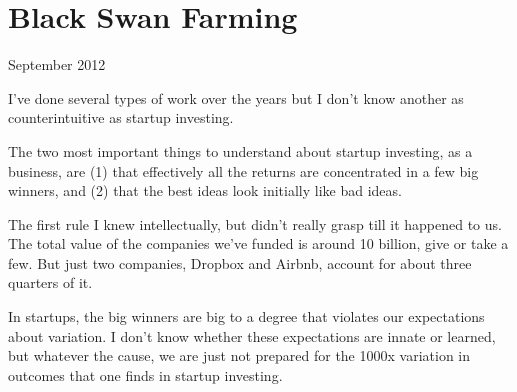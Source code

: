 \chapter{Black Swan Farming}

September 2012

I've done several types of work over the years but I don't know another
as counterintuitive as startup investing.

The two most important things to understand about startup investing, as
a business, are (1) that effectively all the returns are concentrated in
a few big winners, and (2) that the best ideas look initially like bad
ideas.

The first rule I knew intellectually, but didn't really grasp till it
happened to us. The total value of the companies we've funded is around
10 billion, give or take a few. But just two companies, Dropbox and
Airbnb, account for about three quarters of it.

In startups, the big winners are big to a degree that violates our
expectations about variation. I don't know whether these expectations
are innate or learned, but whatever the cause, we are just not prepared
for the 1000x variation in outcomes that one finds in startup investing.

